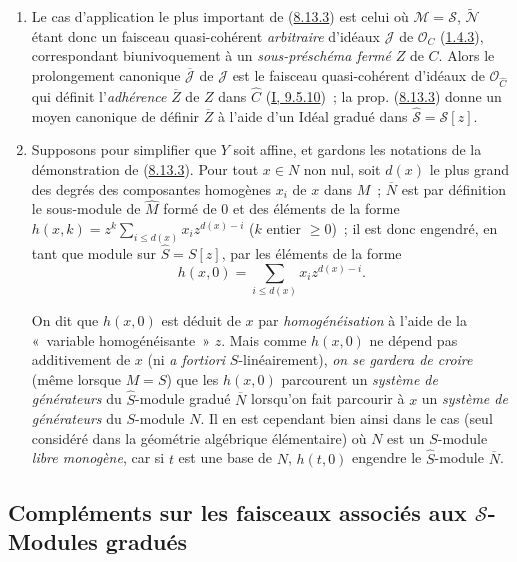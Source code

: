 \begin{remark}[8.13.4]
\label{II.8.13.4-fr}
\begin{enumerate}
  \item[\rm{(i)}] Le cas d'application le plus important de
  (\hyperref[II.8.13.3-fr]{8.13.3}) est celui où
  $\mathcal{M}=\mathcal{S}$, $\widetilde{\mathcal{N}}$ étant donc un faisceau
  quasi-cohérent \emph{arbitraire} d'idéaux $\mathcal{J}$ de
  $\mathcal{O}_C$ (\hyperref[II.1.4.3-fr]{1.4.3}), correspondant
  biunivoquement à un \emph{sous-préschéma fermé} $Z$ de $C$. Alors le
  prolongement canonique $\overline{\mathcal{J}}$ de $\mathcal{J}$ est le
  faisceau quasi-cohérent d'idéaux de $\mathcal{O}_{\widehat{C}}$ qui définit
  l'\emph{adhérence} $\overline{Z}$ de $Z$ dans $\widehat{C}$
  (\hyperref[I.9.5.10-fr]{I, 9.5.10})~; la prop.
  (\hyperref[II.8.13.3-fr]{8.13.3}) donne un moyen canonique de définir
  $\overline{Z}$ à l'aide d'un Idéal gradué dans
  $\widehat{\mathcal{S}}=\mathcal{S}[z]$.
  \item[\rm{(ii)}] Supposons pour simplifier que $Y$ soit affine, et gardons
  les notations de la démonstration de
  (\hyperref[II.8.13.3-fr]{8.13.3}). Pour tout $x\in N$ non nul, soit $d(x)$
  le plus grand des degrés des composantes homogènes $x_i$ de $x$ dans $M$~;
  $\overline{N}$ est par définition le sous-module de $\widehat{M}$ formé de
  $0$ et des éléments de la forme
  $h(x,k)=z^k\sum_{i\leqslant d(x)}x_i z^{d(x)-i}$ ($k$ entier
  $\geqslant0$)~; il est donc engendré, en tant que module sur
  $\widehat{S}=S[z]$, par les éléments de la forme
  \[
    h(x,0)=\sum_{i\leqslant d(x)}x_i z^{d(x)-i}.
  \]

  On dit que $h(x,0)$ est déduit de $x$ par \emph{homogénéisation} à l'aide
  de la «~variable homogénéisante~» $z$. Mais comme $h(x,0)$ ne dépend pas
  additivement de $x$ (ni \emph{a fortiori} $S$-linéairement), \emph{on se
  gardera de croire} (même lorsque $M=S$) que les $h(x,0)$ parcourent un
  \emph{système de générateurs} du $\widehat{S}$-module gradué
  $\overline{N}$ lorsqu'on fait parcourir à $x$ un \emph{système de
  générateurs} du $S$-module $N$. Il en est cependant bien ainsi dans le cas
  (seul considéré dans la géométrie algébrique élémentaire) où $N$ est un
  $S$-module \emph{libre monogène}, car si $t$ est une base de $N$, $h(t,0)$
  engendre le $\widehat{S}$-module $\overline{N}$.
\end{enumerate}
\end{remark}

\subsection{Compléments sur les faisceaux associés aux
$\mathcal{S}$-Modules gradués}
\label{subsection:II.8.14-fr}

